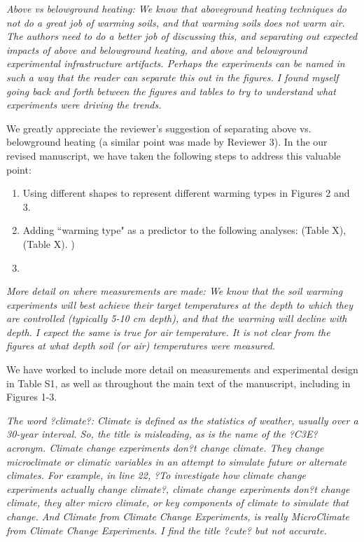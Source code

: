 \documentclass[11pt,a4paper]{letter}
\begin{document}
\begin{letter}{}
\par \emph{Above vs belowground heating:  We know that aboveground heating techniques do not do a great job of warming soils, and that warming soils does not warm air. The authors need to do a better job of discussing this, and separating out expected impacts of above and belowground heating, and above and belowground experimental infrastructure artifacts.  Perhaps the experiments can be named in such a way that the reader can separate this out in the figures. I found myself going back and forth between the figures and tables to try to understand what experiments were driving the trends.} 
\par 
We greatly appreciate the reviewer's suggestion of separating above vs. belowground heating (a similar point was made by Reviewer 3). In the our revised manuscript, we have taken the following steps to address this valuable point:
\begin{enumerate}
\item Using different shapes to represent different warming types in Figures 2 and 3.
\item Adding ``warming type" as a predictor to the following analyses: (Table X), (Table X). )
\item 
\end{enumerate}

\par \emph{More detail on where measurements are made:  We know that the soil warming experiments will best achieve their target temperatures at the depth to which they are controlled (typically 5-10 cm depth), and that the warming will decline with depth.  I expect the same is true for air temperature. It is not clear from the figures at what depth soil (or air) temperatures were measured.}
\par We have worked to include more detail on measurements and experimental design in Table S1, as well as throughout the main text of the manuscript, including in Figures 1-3.

\par \emph{The word ?climate?: Climate is defined as the statistics of weather, usually over a 30-year interval. So, the title is misleading, as is the name of the ?C3E? acronym.  Climate change experiments don?t change climate.  They change microclimate or climatic variables in an attempt to simulate future or alternate climates.  For example, in line 22, ?To investigate how climate change experiments actually change climate?, climate change experiments don?t change climate, they alter micro climate, or key components of climate to simulate that change.  And Climate from Climate Change Experiments, is really MicroClimate from Climate Change Experiments. I find the title ?cute? but not accurate.}


\end{letter}
\end{document}
